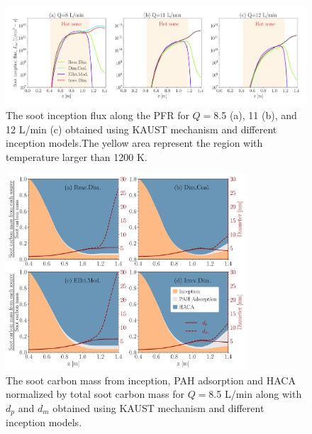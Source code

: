 \begin{figure}[H]
	\centering
	\includegraphics[width=1\textwidth]{Figures/Results/PFR/inception.pdf}
	\caption{The soot inception flux along the PFR for $Q=$8.5 (a), 11 (b), and 12 L/min (c) obtained using KAUST mechanism and different inception models.The yellow area represent the region with temperature larger than 1200 K.}
	\label{fig:pfr_Iinc} 
\end{figure}


\begin{figure}[H]
	\centering
	\includegraphics[width=0.8\textwidth]{Figures/Results/PFR/C_tot_distmap.pdf}
	\caption{The soot carbon mass from inception, PAH adsorption and HACA normalized by total soot carbon mass for $Q=$8.5 L/min along with $d_p$ and $d_m$ obtained using KAUST mechanism and different inception models.}
	\label{fig:pfr_cmap} 
\end{figure}